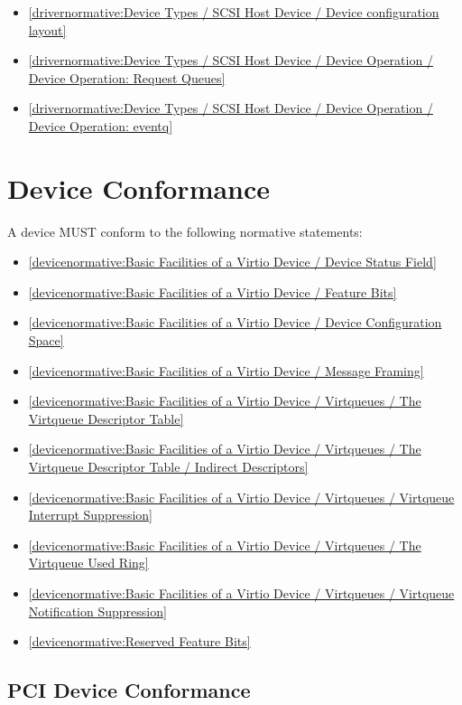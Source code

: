 \begin{itemize}
\item \ref{drivernormative:Device Types / SCSI Host Device / Device configuration layout}
\item \ref{drivernormative:Device Types / SCSI Host Device / Device Operation / Device Operation: Request Queues}
\item \ref{drivernormative:Device Types / SCSI Host Device / Device Operation / Device Operation: eventq}
\end{itemize}

\section{Device Conformance}\label{sec:Conformance / Device Conformance}

A device MUST conform to the following normative statements:

\begin{itemize}
\item \ref{devicenormative:Basic Facilities of a Virtio Device / Device Status Field}
\item \ref{devicenormative:Basic Facilities of a Virtio Device / Feature Bits}
\item \ref{devicenormative:Basic Facilities of a Virtio Device / Device Configuration Space}
\item \ref{devicenormative:Basic Facilities of a Virtio Device / Message Framing}
\item \ref{devicenormative:Basic Facilities of a Virtio Device / Virtqueues / The Virtqueue Descriptor Table}
\item \ref{devicenormative:Basic Facilities of a Virtio Device / Virtqueues / The Virtqueue Descriptor Table / Indirect Descriptors}
\item \ref{devicenormative:Basic Facilities of a Virtio Device / Virtqueues / Virtqueue Interrupt Suppression}
\item \ref{devicenormative:Basic Facilities of a Virtio Device / Virtqueues / The Virtqueue Used Ring}
\item \ref{devicenormative:Basic Facilities of a Virtio Device / Virtqueues / Virtqueue Notification Suppression}
\item \ref{devicenormative:Reserved Feature Bits}
\end{itemize}

\subsection{PCI Device Conformance}\label{sec:Conformance / Device Conformance / PCI Device Conformance}

